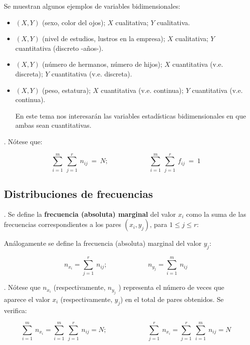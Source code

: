 \begin{example}

Se muestran algunos ejemplos de variables bidimensionales:

\begin{itemize}

\item $(X,Y)$ (sexo, color del ojos); $X$ cualitativa; $Y$ cualitativa.

\item $(X,Y)$ (nivel de estudios, lustros en la empresa); $X$ cualitativa; $Y$ cuantitativa (discreto -años-).

\item $(X,Y)$ (número de hermanos, número de hijos); $X$ cuantitativa (v.e. discreta); $Y$ cuantitativa (v.e. discreta).

\item $(X,Y)$ (peso, estatura); $X$ cuantitativa (v.e. continua); $Y$ cuantitativa (v.e. continua).

En este tema nos interesarán las variables estadísticas bidimensionales en que ambas sean cuantitativas.
\end{itemize}
\end{example}

\begin{theorem}
.	Nótese que:

$$\displaystyle \sum_{i=1}^m \ \sum_{j=1}^r\ n_{ij}\ = \ N;\qquad 	\qquad \qquad\sum_{i=1}^m \ \sum_{j=1}^r\ f_{ij}\ = \ 1$$
\end{theorem}



\subsection{Distribuciones de frecuencias}
	


\begin{definition}
.	Se define la \textbf{frecuencia (absoluta) marginal} del valor $x_i$ como la suma de las frecuencias correspondientes a los pares $(x_i,y_j)$, para $1 \le  j \le  r$:
	

Análogamente se define la frecuencia (absoluta) marginal del valor $y_j$:

$$n_{x_i}=\displaystyle \sum_{j=1}^r\ n_{ij}; \qquad \qquad \qquad n_{y_j}=\displaystyle \sum_{i=1}^m\ n_{ij}$$
\end{definition}



\begin{theorem}
.	Nótese que $n_{x_i}$ (respectivamente, $n_{y_j}$ ) representa el número de veces que aparece el valor $x_i$ (respectivamente, $y_j$) en el total de pares obtenidos. Se verifica:

$$\displaystyle \sum_{i=1}^m\ n_{x_i}=\sum_{i=1}^m\ \sum_{j=1}^r\ n_{ij}=N; \qquad \qquad \qquad
\sum_{j=1}^r\ n_{x_i}=\sum_{j=1}^r\ \sum_{i=1}^m\ n_{ij} = N$$	
\end{theorem}



